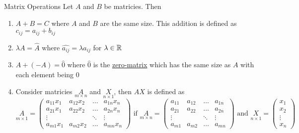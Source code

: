 \begin{impbox}{Matrix Operations}{}
    Let $A$ and $B$ be matricies. Then
    \begin{enumerate}
        \item $A + B = C$ where $A$ and $B$ are the same size. This addition is defined as $c_{ij} = a_{ij} + b_{ij}$
        \item $\lambda A = \hat{A}$ where $\hat{a_{ij}} = \lambda a_{ij}$ for $\lambda \in \mathbb R$
        \item $A + (-A) = \hat{0}$ where $\hat{0}$ is the \underline{zero-matrix} which has the same size as $A$ with each element being $0$
        \item Consider matricies $\underset{m \times n}{A}$ and $\underset{n\times 1}{X}$, then $AX$ is defined as
        \[
            \underset{m \times 1}{A} = 
            \begin{pmatrix}
                a_{11}x_{1} & a_{12}x_2 & \dots & a_{1n}x_n \\
                a_{21}x_1 & a_{22}x_2 & \dots & a_{2n}x_n \\
                \vdots & & \ddots & \vdots \\
                a_{m1}x_1 & a_{m2}x_2 & \dots & a_{mn}x_n
            \end{pmatrix}
            \text{ if }
            \underset{m\times n}{A} = 
            \begin{pmatrix}
                a_{11} & a_{12} & \dots & a_{1n} \\
                a_{21} & a_{22} & \dots & a_{2n} \\
                \vdots & & \ddots & \vdots \\
                a_{m1} & a_{m2} & \dots & a_{mn}
            \end{pmatrix}
            \text{ and }
            \underset{n \times 1}{X} = 
            \begin{pmatrix}
                x_1 \\
                x_2 \\
                \vdots 
                \\ 
                x_n
            \end{pmatrix}
        \]
    \end{enumerate}
\end{impbox}

